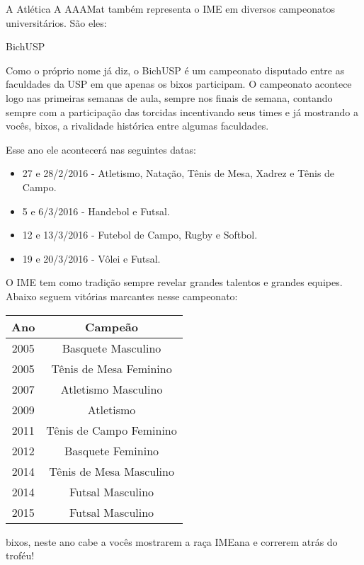 \begin{secao}{A Atlética}
A AAAMat também representa o IME em diversos campeonatos universitários. São
eles:

\begin{subsecao}{BichUSP}

Como o próprio nome já diz, o BichUSP é um campeonato disputado entre as
faculdades da USP em que apenas os bixos participam. O campeonato acontece logo
nas primeiras semanas de aula, sempre nos finais de semana, contando sempre com
a participação das torcidas incentivando seus times e já mostrando a vocês, bixos,
a rivalidade histórica entre algumas faculdades.

Esse ano ele acontecerá nas seguintes datas:
\begin{itemize}
  \item 27 e 28/2/2016 - Atletismo, Natação, Tênis de Mesa, Xadrez e Tênis de
        Campo.
  \item 5 e 6/3/2016 - Handebol e Futsal.
  \item 12 e 13/3/2016 - Futebol de Campo, Rugby e Softbol.
  \item 19 e 20/3/2016 - Vôlei e Futsal.
\end{itemize}

O IME tem como tradição sempre revelar grandes talentos e grandes equipes.
Abaixo seguem vitórias marcantes nesse campeonato:

\begin{center}
	\begin{tabular}{c|c}
	  \hline
	  Ano & Campeão\\
	  \hline
	  2005 & Basquete Masculino \\
	  2005 & Tênis de Mesa Feminino \\
	  2007 & Atletismo Masculino\\
	  2009 & Atletismo\\
	  2011 & Tênis de Campo Feminino\\
	  2012 & Basquete Feminino\\
	  2014 & Tênis de Mesa Masculino\\
	  2014 & Futsal Masculino\\
	  2015 & Futsal Masculino\\
 	  \hline
	\end{tabular}
\end{center}


bixos, neste ano cabe a vocês mostrarem a raça IMEana e correrem atrás do
troféu!


\end{subsecao}
\end{secao}
